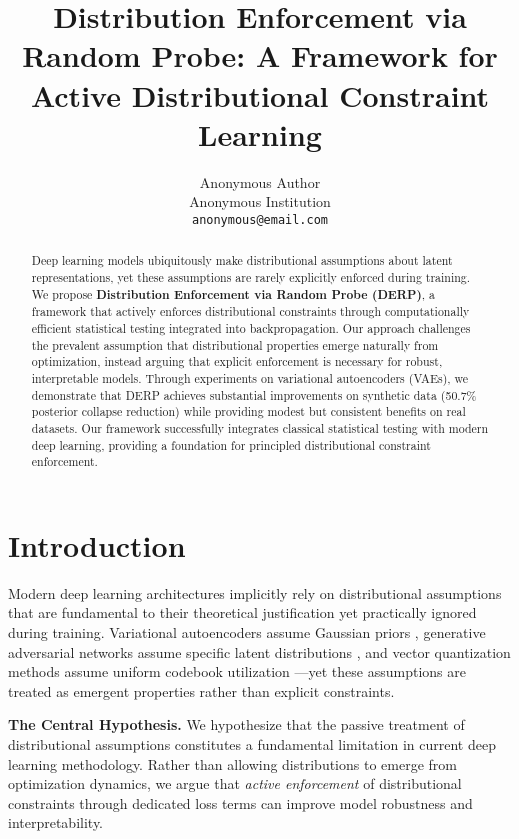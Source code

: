 \documentclass{article}
\title{Distribution Enforcement via Random Probe: A Framework for Active Distributional Constraint Learning}
\author{%
  Anonymous Author\\
  Anonymous Institution\\
  \texttt{anonymous@email.com}
}
\begin{document}
\maketitle

\begin{abstract}
Deep learning models ubiquitously make distributional assumptions about latent representations, yet these assumptions are rarely explicitly enforced during training. We propose \textbf{Distribution Enforcement via Random Probe (DERP)}, a framework that actively enforces distributional constraints through computationally efficient statistical testing integrated into backpropagation. Our approach challenges the prevalent assumption that distributional properties emerge naturally from optimization, instead arguing that explicit enforcement is necessary for robust, interpretable models. Through experiments on variational autoencoders (VAEs), we demonstrate that DERP achieves substantial improvements on synthetic data (50.7\% posterior collapse reduction) while providing modest but consistent benefits on real datasets. Our framework successfully integrates classical statistical testing with modern deep learning, providing a foundation for principled distributional constraint enforcement.
\end{abstract}

\section{Introduction}

Modern deep learning architectures implicitly rely on distributional assumptions that are fundamental to their theoretical justification yet practically ignored during training. Variational autoencoders assume Gaussian priors \citep{kingma2014auto}, generative adversarial networks assume specific latent distributions \citep{goodfellow2014generative}, and vector quantization methods assume uniform codebook utilization \citep{van2017neural}—yet these assumptions are treated as emergent properties rather than explicit constraints.

\textbf{The Central Hypothesis.} We hypothesize that the passive treatment of distributional assumptions constitutes a fundamental limitation in current deep learning methodology. Rather than allowing distributions to emerge from optimization dynamics, we argue that \emph{active enforcement} of distributional constraints through dedicated loss terms can improve model robustness and interpretability.
\end{document}
